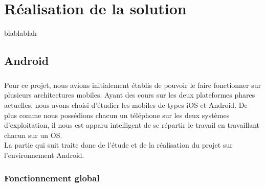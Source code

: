 \cleardoublepage



\chapter{Réalisation de la solution}


blablablah


\section{Android}



\paragraph{}
Pour ce projet, nous avions initialement établis de pouvoir le faire fonctionner sur plusieurs 
architectures mobiles. Ayant des cours sur les deux plateformes phares actuelles, nous avons choisi
d'étudier les mobiles de types iOS et Android. De plus comme nous possédions chacun un téléphone 
sur les deux systèmes d'exploitation, il nous est apparu intelligent de se répartir le travail en 
travaillant chacun sur un OS.
\\
La partie qui suit traite donc de l'étude et de la réalisation du projet sur l'environnement Android.


\subsection{Fonctionnement global}


